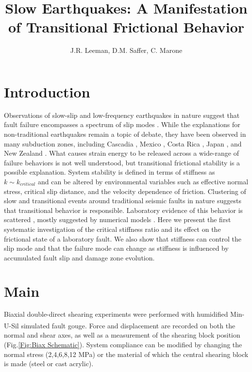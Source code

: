 \documentclass[11pt]{article}
\title{Slow Earthquakes: A Manifestation of Transitional Frictional Behavior}
\author{J.R. Leeman, D.M. Saffer, C. Marone}
\date{} %
\begin{document}
\maketitle

\section{Introduction}
Observations of slow-slip and low-frequency earthquakes in nature suggest that
fault failure encompasses a spectrum of slip modes \cite{Peng:2010, Ide:2007,
Beroza:2011}.  While the explanations for non-traditional earthquakes remain a
topic of debate, they have been observed in many subduction zones, including
Cascadia \cite{Miller:2002, Rogers:2003}, Mexico \cite{Kostoglodov:2003}, Costa
Rica \cite{Jiang:2012}, Japan \cite{Ito:2006}, and New Zealand
\cite{Wallace:2010}. What causes strain energy to be released across a
wide-range of failure behaviors is not well understood, but transitional
frictional stability is a  possible explanation. System stability is defined in
terms of stiffness as $k \sim k_{critical}$ \cite{Gu:1984} and can be altered by
environmental variables such as effective normal stress, critical slip distance,
and the velocity dependence of friction. Clustering of slow and transitional
events around traditional seismic faults in nature suggests that transitional
behavior is responsible. Laboratory evidence of this behavior is scattered
\cite{Kaproth:2013, Baumberger:1994, Leeman:2015}, mostly suggested by numerical
models \cite{Gu:1984}. Here we present the first systematic investigation of the
critical stiffness ratio and its effect on the frictional state of a laboratory
fault. We also show that stiffness can control the slip mode and that the
failure mode can change as stiffness is influenced by accumulated fault slip and
damage zone evolution.  


\section{Main}
Biaxial double-direct shearing experiments were performed with humidified
Min-U-Sil\textsuperscript{\textregistered} simulated fault gouge. Force and
displacement are recorded on both the normal and shear axes, as well as a measurement of the shearing
block position (Fig.\ref{Fig:Biax Schematic}). System compliance can be modified
by changing the normal stress (2,4,6,8,12 MPa) or the material of which the
central shearing block is made (steel or cast acrylic).
\end{document}
